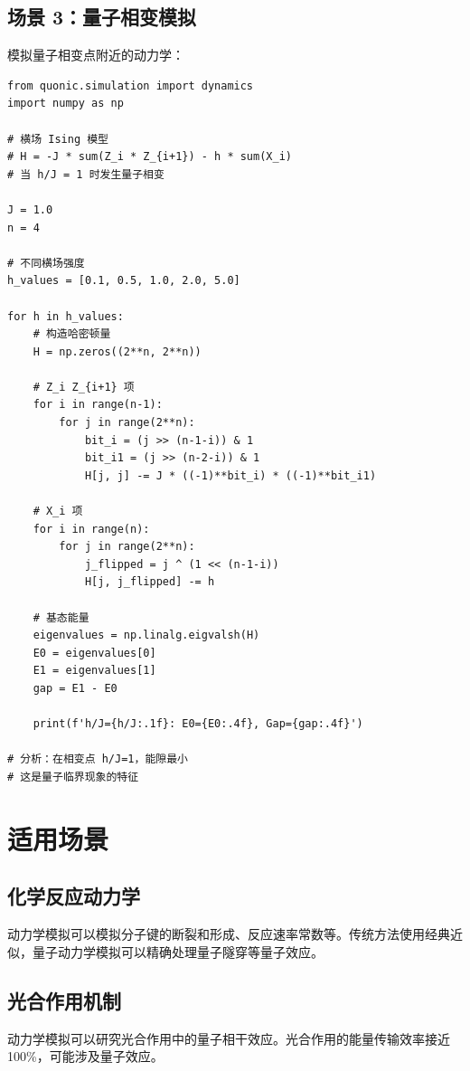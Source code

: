 \documentclass[12pt,a4paper]{article}
\begin{document}
\subsection{场景 3：量子相变模拟}

模拟量子相变点附近的动力学：

\begin{verbatim}
from quonic.simulation import dynamics
import numpy as np

# 横场 Ising 模型
# H = -J * sum(Z_i * Z_{i+1}) - h * sum(X_i)
# 当 h/J = 1 时发生量子相变

J = 1.0
n = 4

# 不同横场强度
h_values = [0.1, 0.5, 1.0, 2.0, 5.0]

for h in h_values:
    # 构造哈密顿量
    H = np.zeros((2**n, 2**n))

    # Z_i Z_{i+1} 项
    for i in range(n-1):
        for j in range(2**n):
            bit_i = (j >> (n-1-i)) & 1
            bit_i1 = (j >> (n-2-i)) & 1
            H[j, j] -= J * ((-1)**bit_i) * ((-1)**bit_i1)

    # X_i 项
    for i in range(n):
        for j in range(2**n):
            j_flipped = j ^ (1 << (n-1-i))
            H[j, j_flipped] -= h

    # 基态能量
    eigenvalues = np.linalg.eigvalsh(H)
    E0 = eigenvalues[0]
    E1 = eigenvalues[1]
    gap = E1 - E0

    print(f'h/J={h/J:.1f}: E0={E0:.4f}, Gap={gap:.4f}')

# 分析：在相变点 h/J=1，能隙最小
# 这是量子临界现象的特征
\end{verbatim}

\section{适用场景}

\subsection{化学反应动力学}

动力学模拟可以模拟分子键的断裂和形成、反应速率常数等。传统方法使用经典近似，量子动力学模拟可以精确处理量子隧穿等量子效应。

\subsection{光合作用机制}

动力学模拟可以研究光合作用中的量子相干效应。光合作用的能量传输效率接近 100\%，可能涉及量子效应。
\end{document}
